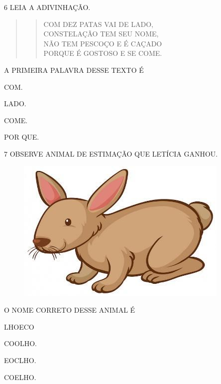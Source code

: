 \num{6} LEIA A ADIVINHAÇÃO. 

\begin{quote}
\begin{verse}
COM DEZ PATAS VAI DE LADO,\\
CONSTELAÇÃO TEM SEU NOME,\\
NÃO TEM PESCOÇO E É CAÇADO\\
PORQUE É GOSTOSO E SE COME.
\end{verse}

\end{quote}

A PRIMEIRA PALAVRA DESSE TEXTO É

\begin{escolha}
\item COM.

\item LADO.

\item COME.

\item POR QUE.
\end{escolha}

\pagebreak
\num{7} OBSERVE ANIMAL DE ESTIMAÇÃO QUE LETÍCIA GANHOU.

\begin{figure}[htpb]
\centering
\includegraphics[width=.5\textwidth]{media/image246.jpg}
\end{figure}

O NOME CORRETO DESSE ANIMAL É

\begin{escolha}
\item LHOECO

\item COOLHO.

\item EOCLHO.

\item COELHO.
\end{escolha}

